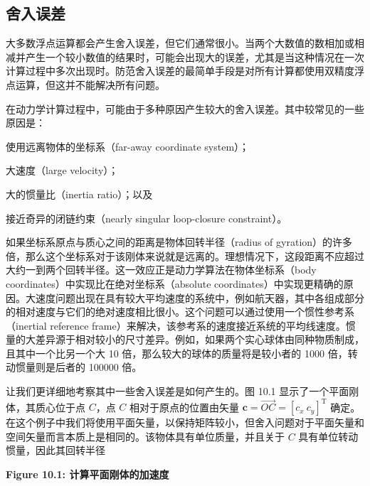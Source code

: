 \documentclass[10pt,a4paper]{book}
\theoremstyle{thmstyle} %
\theoremstyle{defstyle} %
\theoremstyle{prostyle} %
\begin{document}
\subsection{舍入误差}





大多数浮点运算都会产生舍入误差，但它们通常很小。当两个大数值的数相加或相减并产生一个较小数值的结果时，可能会出现大的误差，尤其是当这种情况在一次计算过程中多次出现时。防范舍入误差的最简单手段是对所有计算都使用双精度浮点运算，但这并不能解决所有问题。



在动力学计算过程中，可能由于多种原因产生较大的舍入误差。其中较常见的一些原因是：



使用远离物体的坐标系（far-away coordinate system）；



大速度（large velocity）；



大的惯量比（inertia ratio）；以及



接近奇异的闭链约束（nearly singular loop-closure constraint）。



如果坐标系原点与质心之间的距离是物体回转半径（radius of gyration）的许多倍，那么这个坐标系对于该刚体来说就是远离的。理想情况下，这段距离不应超过大约一到两个回转半径。这一效应正是动力学算法在物体坐标系（body coordinates）中实现比在绝对坐标系（absolute coordinates）中实现更精确的原因。大速度问题出现在具有较大平均速度的系统中，例如航天器，其中各组成部分的相对速度与它们的绝对速度相比很小。这个问题可以通过使用一个惯性参考系（inertial reference frame）来解决，该参考系的速度接近系统的平均线速度。惯量的大差异源于相对较小的尺寸差异。例如，如果两个实心球体由同种物质制成，且其中一个比另一个大 10 倍，那么较大的球体的质量将是较小者的 1000 倍，转动惯量则是后者的 100000 倍。



让我们更详细地考察其中一些舍入误差是如何产生的。图 10.1 显示了一个平面刚体，其质心位于点 $C$，点 $C$ 相对于原点的位置由矢量 $\mathbf{c}=\overrightarrow{OC}=[c_{x}\ c_{y}]^{\mathrm{T}}$ 确定。在这个例子中我们将使用平面矢量，以保持矩阵较小，但舍入问题对于平面矢量和空间矢量而言本质上是相同的。该物体具有单位质量，并且关于 $C$ 具有单位转动惯量，因此其回转半径



\noindent\textbf{Figure 10.1: 计算平面刚体的加速度}
\end{document}
